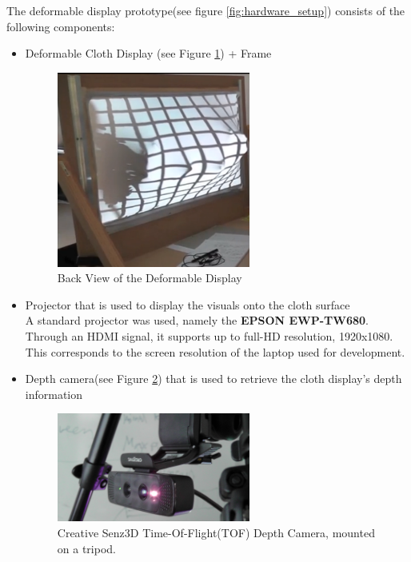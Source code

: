 \documentclass[]{article}
\begin{document}
The deformable display prototype(see figure \ref{fig:hardware_setup}) consists of the following components:
\begin{itemize}
\item Deformable Cloth Display (see Figure \ref{fig:BackViewDeformableDisplay}) + Frame
\begin{figure}[hbtp]
    \centering
    \includegraphics[width=0.6\textwidth]{figures/DisplayBackView.png}
    \caption{Back View of the Deformable Display}
    \label{fig:BackViewDeformableDisplay}
\end{figure}
\item Projector that is used to display the visuals onto the cloth surface\\

A standard projector was used, namely the \textbf{EPSON EWP-TW680}. Through an HDMI signal, it supports up to full-HD resolution, 1920x1080. This corresponds to the screen resolution of the laptop used for development.
\item Depth camera(see Figure \ref{fig:CreativeSenz3D}) that is used to retrieve the cloth display’s depth information\\

\begin{figure}[hbtp]
    \centering
    \includegraphics[width=0.6\textwidth]{figures/CreativeDepthCam.JPG}
    \caption{Creative Senz3D Time-Of-Flight(TOF) Depth Camera, mounted on a tripod.}
    \label{fig:CreativeSenz3D}
\end{figure}


\end{itemize}
\end{document}
